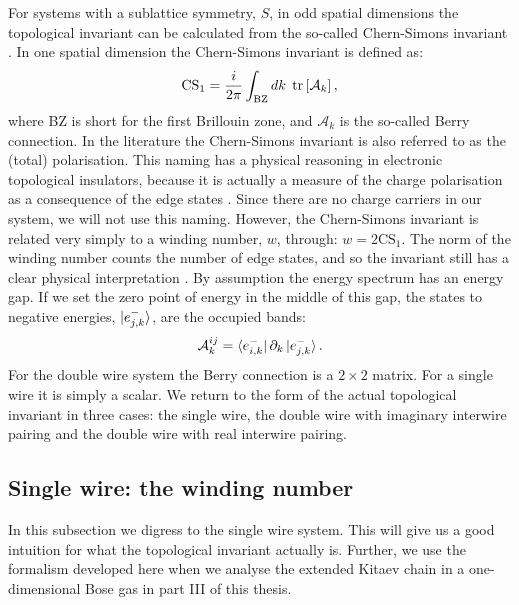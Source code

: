 For systems with a sublattice symmetry, $S$, in odd spatial dimensions the topological invariant can be calculated from the so-called Chern-Simons invariant \cite{Ryu.Topology}. In one spatial dimension the Chern-Simons invariant is defined as:
\begin{equation}
\text{CS}_1 = \frac{i}{2\pi}\int_{\text{BZ}}dk \; \operatorname{tr}\left[\mathcal{A}_k\right],
\label{eq.definition.CS1}
\end{equation}
where BZ is short for the first Brillouin zone, and $\mathcal{A}_k$ is the so-called Berry connection. In the literature the Chern-Simons invariant is also referred to as the (total) polarisation. This naming has a physical reasoning in electronic topological insulators, because it is actually a measure of the charge polarisation as a consequence of the edge states \cite{FuKane2006}. Since there are no charge carriers in our system, we will not use this naming. However, the Chern-Simons invariant is related very simply to a winding number, $w$, through: $w = 2\text{CS}_1$. The norm of the winding number counts the number of edge states, and so the invariant still has a clear physical interpretation \cite{Chiu.Topology}. By assumption the energy spectrum has an energy gap. If we set the zero point of energy in the middle of this gap, the states to negative energies, $\ket{e^{-}_{j,k}}$, are the occupied bands: 
\begin{equation}
\mathcal{A}^{ij}_k = \bra{e^{-}_{i,k}}\partial_k\ket{e^{-}_{j,k}}.
\end{equation}
For the double wire system the Berry connection is a $2\times 2$ matrix. For a single wire it is simply a scalar. We return to the form of the actual topological invariant in three cases: the single wire, the double wire with imaginary interwire pairing and the double wire with real interwire pairing. 

\subsection{Single wire: the winding number} \label{subsec.topologicalinvariant.singlewire}
In this subsection we digress to the single wire system. This will give us a good intuition for what the topological invariant actually is. Further, we use the formalism developed here when we analyse the extended Kitaev chain in a one-dimensional Bose gas in part III of this thesis. 

